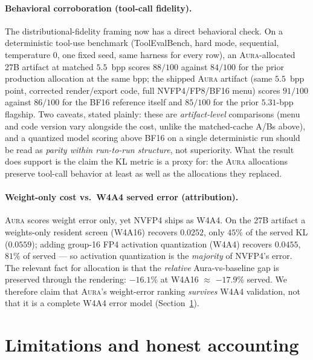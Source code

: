 \documentclass[11pt]{article}
\theoremstyle{plain}
\theoremstyle{definition}
\begin{document}
\paragraph{Behavioral corroboration (tool-call fidelity).} The
distributional-fidelity framing now has a direct behavioral check. On a
deterministic tool-use benchmark (ToolEvalBench, hard mode, sequential,
temperature $0$, one fixed seed, same harness for every row), an
\textsc{Aura}-allocated 27B artifact at matched $5.5$~bpp scores $88/100$
against $84/100$ for the prior production allocation at the same bpp; the
shipped \textsc{Aura} artifact (same $5.5$~bpp point, corrected render/export
code, full NVFP4/FP8/BF16 menu) scores $91/100$ against $86/100$ for the BF16
reference itself and $85/100$ for the prior $5.31$-bpp flagship. Two caveats,
stated plainly: these are \emph{artifact-level} comparisons (menu and code
version vary alongside the cost, unlike the matched-cache A/Bs above), and a
quantized model scoring above BF16 on a single deterministic run should be read
as \emph{parity within run-to-run structure}, not superiority. What the result
does support is the claim the KL metric is a proxy for: the \textsc{Aura}
allocations preserve tool-call behavior at least as well as the allocations they
replaced.

\paragraph{Weight-only cost vs.\ W4A4 served error (attribution).} \textsc{Aura}
scores weight error only, yet NVFP4 ships as W4A4. On the 27B artifact a
weights-only resident screen (W4A16) recovers $0.0252$, only $45\%$ of the served
KL ($0.0559$); adding group-16 FP4 activation quantization (W4A4) recovers
$0.0455$, $81\%$ of served --- so activation quantization is the \emph{majority}
of NVFP4's error. The relevant fact for allocation is that the \emph{relative}
Aura-vs-baseline gap is preserved through the rendering: $-16.1\%$ at W4A16
$\approx$ $-17.9\%$ served. We therefore claim that \textsc{Aura}'s weight-error
ranking \emph{survives} W4A4 validation, not that it is a complete W4A4 error
model (Section~\ref{sec:limits}).

\section{Limitations and honest accounting}\label{sec:limits}
\end{document}
